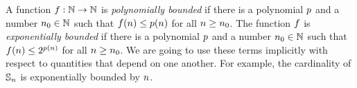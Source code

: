 
A function $f : \mathbb{N} \to \mathbb{N}$ is \emph{polynomially bounded} if there is a
polynomial $p$ and a number $n_0 \in \mathbb{N}$ such
that $f(n) \leq p(n)$ for all $n \geq n_0$.
The function $f$ is \emph{exponentially bounded} if there is a polynomial
$p$ and a number $n_0 \in \mathbb{N}$ such that
$f(n) \leq 2^{p(n)}$ for all $n \geq n_0$.
We are going to use these terms implicitly with respect to quantities that
depend on one another. For example, the cardinality of $\mathbb{S}_{n}$ is
exponentially bounded by $n$.
